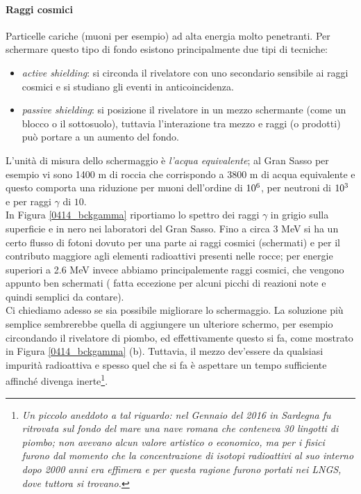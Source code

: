 \paragraph{Raggi cosmici}
Particelle cariche (muoni per esempio) ad alta energia molto penetranti. Per schermare questo tipo di fondo esistono principalmente due tipi di tecniche:
\begin{itemize}
	\item \textit{active shielding}: si circonda il rivelatore con uno secondario sensibile ai raggi cosmici e si studiano gli eventi in anticoincidenza.
	\item \textit{passive shielding}: si posizione il rivelatore in un mezzo schermante (come un blocco o il sottosuolo), tuttavia l'interazione tra mezzo e raggi (o prodotti) può portare a un aumento del fondo.
\end{itemize}
L'unità di misura dello schermaggio è \textit{l'acqua equivalente}; al Gran Sasso per esempio vi sono 1400 m di roccia che corrispondo a 3800 m di acqua equivalente e questo comporta una riduzione per muoni dell'ordine di $10^{6}$, per neutroni di $10^{3}$ e per raggi $\gamma$ di $10$.\\
In Figura \ref{0414_bckgamma} riportiamo lo spettro dei raggi $\gamma$ in grigio sulla superficie e in nero nei laboratori del Gran Sasso.
Fino a circa 3 MeV si ha un certo flusso di fotoni dovuto per una  parte ai raggi cosmici (schermati) e per il contributo maggiore agli elementi radioattivi presenti nelle rocce; per energie superiori a 2.6 MeV invece abbiamo principalemente raggi cosmici, che vengono appunto ben schermati ( fatta eccezione per alcuni picchi di reazioni note e quindi semplici da contare).\\
Ci chiediamo adesso se sia possibile migliorare lo schermaggio. La soluzione più semplice sembrerebbe quella di aggiungere un ulteriore schermo, per esempio circondando il rivelatore di piombo, ed effettivamente questo si fa, come mostrato in Figura \ref{0414_bckgamma} (b). Tuttavia, il mezzo dev'essere  da qualsiasi impurità radioattiva e spesso quel che si fa è aspettare un tempo sufficiente affinché divenga inerte\footnote{\itshape Un piccolo aneddoto a tal riguardo: nel Gennaio del 2016 in Sardegna fu ritrovata sul fondo del mare una nave romana che conteneva 30 lingotti di piombo; non avevano alcun valore artistico o economico, ma per i fisici furono  dal momento che la concentrazione di isotopi radioattivi al suo interno dopo 2000 anni era effimera e per questa ragione furono portati nei LNGS, dove tuttora si trovano.}.


